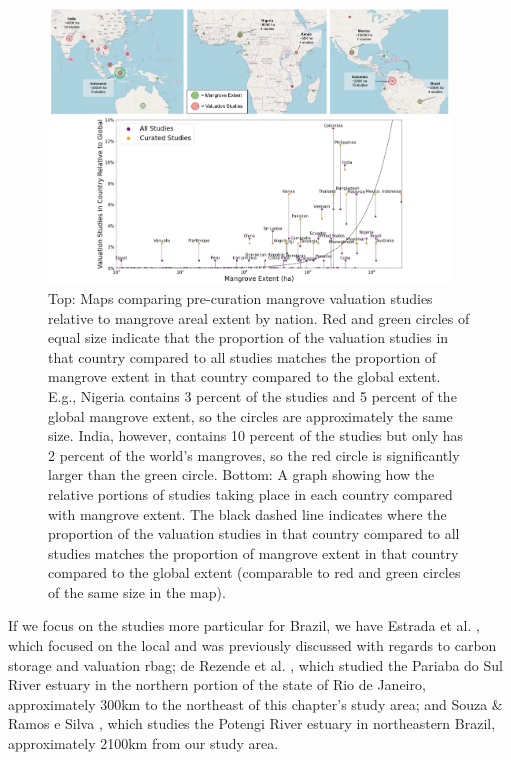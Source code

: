 \begin{figure}[!htb] 
\centering
\includegraphics[width=0.95\textwidth]{Figures/chap4/mangrove_area_studies_graphic_combo.png}
\caption[Mangrove Valuation Studies Compared to Mangrove Extent]{Top: Maps comparing pre-curation mangrove valuation studies relative to mangrove areal extent by nation. Red and green circles of equal size indicate that the proportion of the valuation studies in that country compared to all studies matches the proportion of mangrove extent in that country compared to the global extent. E.g., Nigeria contains 3 percent of the studies and 5 percent of the global mangrove extent, so the circles are approximately the same size. India, however, contains 10 percent of the studies but only has 2 percent of the world’s mangroves, so the red circle is significantly larger than the green circle.
Bottom: A graph showing how the relative portions of studies taking place in each country compared with mangrove extent. The black dashed line indicates where the proportion of the valuation studies in that country compared to all studies matches the proportion of mangrove extent in that country compared to the global extent (comparable to red and green circles of the same size in the map).}
\label{fig:mangrove_area_studies}
\end{figure}

If we focus on the studies more particular for Brazil, we have Estrada et al. \cite{estradaEconomicEvaluationCarbon2015}, which focused on the local and was previously discussed with regards to carbon storage and valuation \ac{rbag}; de Rezende et al. \cite{derezendeEconomicValuationMangrove2015}, which studied the Pariaba do Sul River estuary in the northern portion of the state of Rio de Janeiro, approximately 300km to the northeast of this chapter's study area; and Souza \& Ramos e Silva \cite{souzaEcologicalEconomicValuation2011}, which studies the Potengi River estuary in northeastern Brazil, approximately 2100km from our study area.

